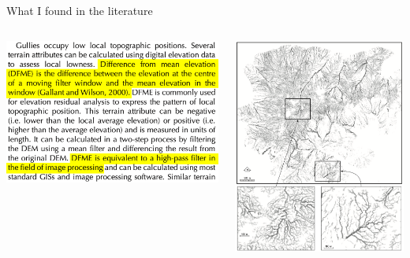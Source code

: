 \documentclass[aspectratio=169]{beamer}
\begin{document}
\begin{frame}{What I found in the literature}
\vspace{0.5 cm}
\begin{columns}
\includegraphics[width=\linewidth]{img/evans-lindsay-2010-gully-exerpt.png}

\includegraphics[width=\linewidth]{img/evans-lindsay-2010-gully-figure.png}
\end{columns}
\end{frame}
\end{document}
